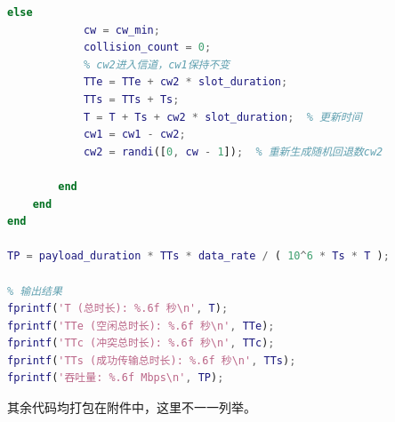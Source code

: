 \documentclass[bwprint]{gmcmthesis}
\begin{document}
\begin{lstlisting}[language=MATLAB]
        else
            cw = cw_min;
            collision_count = 0;
            % cw2进入信道，cw1保持不变
            TTe = TTe + cw2 * slot_duration;
            TTs = TTs + Ts;
            T = T + Ts + cw2 * slot_duration;  % 更新时间
            cw1 = cw1 - cw2;
            cw2 = randi([0, cw - 1]);  % 重新生成随机回退数cw2
            
        end
    end
end

TP = payload_duration * TTs * data_rate / ( 10^6 * Ts * T );

% 输出结果
fprintf('T (总时长): %.6f 秒\n', T);
fprintf('TTe (空闲总时长): %.6f 秒\n', TTe);
fprintf('TTc (冲突总时长): %.6f 秒\n', TTc);
fprintf('TTs (成功传输总时长): %.6f 秒\n', TTs);
fprintf('吞吐量: %.6f Mbps\n', TP);
 \end{lstlisting}

其余代码均打包在附件中，这里不一一列举。
\end{document}
